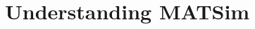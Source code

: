  \cleardoublepage
 \cleardoublepage

\part{Understanding MATSim} \cleardoublepage
 \cleardoublepage
 \cleardoublepage

 \cleardoublepage




{}
 \cleardoublepage



